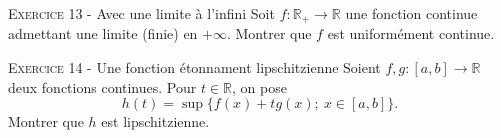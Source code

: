\documentclass[11pt]{article}
\begin{document}


\vskip0.3cm\noindent\textsc{Exercice 13} - Avec une limite à l'infini
\vskip0.2cm
Soit $f:\mathbb R_+\to\mathbb R$ une fonction continue admettant une limite (finie) en $+\infty$. Montrer que $f$ est uniformément continue.




\vskip0.3cm\noindent\textsc{Exercice 14} - Une fonction étonnament lipschitzienne
\vskip0.2cm
Soient $f,g:[a,b]\to\mathbb R$ deux fonctions continues. Pour $t\in\mathbb R$, on pose
$$h(t)=\sup\{f(x)+tg(x);\ x\in[a,b]\}.$$
Montrer que $h$ est lipschitzienne.




\vskip0.5cm

\end{document}
